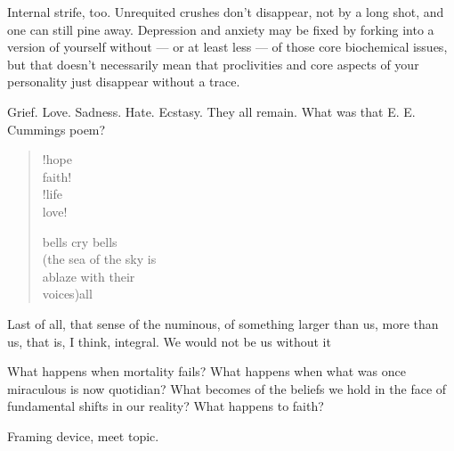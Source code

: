 Internal strife, too. Unrequited crushes don't disappear, not by a long shot, and one can still pine away. Depression and anxiety may be fixed by forking into a version of yourself without --- or at least less --- of those core biochemical issues, but that doesn't necessarily mean that proclivities and core aspects of your personality just disappear without a trace.

Grief. Love. Sadness. Hate. Ecstasy. They all remain. What was that E. E. Cummings poem?

\begin{quote}
!hope\\
faith!\\
!life\\
love!

bells cry bells\\
(the sea of the sky is\\
ablaze with their\\
voices)all
\end{quote}

Last of all, that sense of the numinous, of something larger than us, more than us, that is, I think, integral. We would not be us without it

What happens when mortality fails? What happens when what was once miraculous is now quotidian? What becomes of the beliefs we hold in the face of fundamental shifts in our reality? What happens to faith?

Framing device, meet topic.

